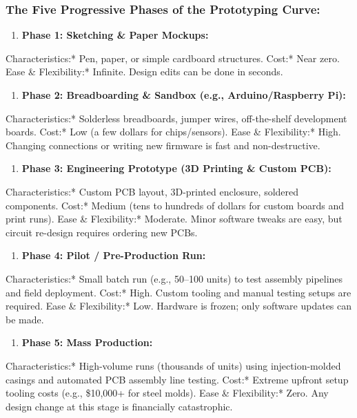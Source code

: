 \subsubsection{The Five Progressive Phases of the Prototyping Curve:}
\begin{enumerate}
  \item \textbf{Phase 1: Sketching \& Paper Mockups:}
\end{enumerate}
    \textit{   }Characteristics:* Pen, paper, or simple cardboard structures.
    \textit{   }Cost:* Near zero.
    \textit{   }Ease \& Flexibility:* Infinite. Design edits can be done in seconds.
\begin{enumerate}
  \item \textbf{Phase 2: Breadboarding \& Sandbox (e.g., Arduino/Raspberry Pi):}
\end{enumerate}
    \textit{   }Characteristics:* Solderless breadboards, jumper wires, off-the-shelf development boards.
    \textit{   }Cost:* Low (a few dollars for chips/sensors).
    \textit{   }Ease \& Flexibility:* High. Changing connections or writing new firmware is fast and non-destructive.
\begin{enumerate}
  \item \textbf{Phase 3: Engineering Prototype (3D Printing \& Custom PCB):}
\end{enumerate}
    \textit{   }Characteristics:* Custom PCB layout, 3D-printed enclosure, soldered components.
    \textit{   }Cost:* Medium (tens to hundreds of dollars for custom boards and print runs).
    \textit{   }Ease \& Flexibility:* Moderate. Minor software tweaks are easy, but circuit re-design requires ordering new PCBs.
\begin{enumerate}
  \item \textbf{Phase 4: Pilot / Pre-Production Run:}
\end{enumerate}
    \textit{   }Characteristics:* Small batch run (e.g., 50–100 units) to test assembly pipelines and field deployment.
    \textit{   }Cost:* High. Custom tooling and manual testing setups are required.
    \textit{   }Ease \& Flexibility:* Low. Hardware is frozen; only software updates can be made.
\begin{enumerate}
  \item \textbf{Phase 5: Mass Production:}
\end{enumerate}
    \textit{   }Characteristics:* High-volume runs (thousands of units) using injection-molded casings and automated PCB assembly line testing.
    \textit{   }Cost:* Extreme upfront setup tooling costs (e.g., \$10,000+ for steel molds).
    \textit{   }Ease \& Flexibility:* Zero. Any design change at this stage is financially catastrophic.


